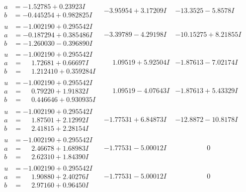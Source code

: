 \documentclass[1p]{elsarticle_modified}
\theoremstyle{definition}
\begin{document}
$$\begin{array}{c|c|c}
\begin{aligned}
a &= -1.52785 + 0.23923 I \\
b &= -0.445254 + 0.982825 I\end{aligned}
 & -3.95954 + 3.17209 I & -13.3525 - 5.8578 I \\ \hline\begin{aligned}
u &= -1.002190 + 0.295542 I \\
a &= -0.187294 + 0.385486 I \\
b &= -1.260030 - 0.396890 I\end{aligned}
 & -3.39789 - 4.29198 I & -10.15275 + 8.21855 I \\ \hline\begin{aligned}
u &= -1.002190 + 0.295542 I \\
a &= \phantom{-}1.72681 + 0.66697 I \\
b &= \phantom{-}1.212410 + 0.359284 I\end{aligned}
 & \phantom{-}1.09519 + 5.92504 I & -1.87613 - 7.02174 I \\ \hline\begin{aligned}
u &= -1.002190 + 0.295542 I \\
a &= \phantom{-}0.79220 + 1.91832 I \\
b &= \phantom{-}0.446646 + 0.930935 I\end{aligned}
 & \phantom{-}1.09519 - 4.07643 I & -1.87613 + 5.43329 I \\ \hline\begin{aligned}
u &= -1.002190 + 0.295542 I \\
a &= \phantom{-}1.87501 + 2.12992 I \\
b &= \phantom{-}2.41815 + 2.28154 I\end{aligned}
 & -1.77531 + 6.84873 I & -12.8872 - 10.8178 I \\ \hline\begin{aligned}
u &= -1.002190 + 0.295542 I \\
a &= \phantom{-}2.46678 + 1.68983 I \\
b &= \phantom{-}2.62310 + 1.84390 I\end{aligned}
 & -1.77531 - 5.00012 I & \phantom{-0.000000 } 0 \\ \hline\begin{aligned}
u &= -1.002190 + 0.295542 I \\
a &= \phantom{-}1.90880 + 2.40276 I \\
b &= \phantom{-}2.97160 + 0.96450 I\end{aligned}
 & -1.77531 - 5.00012 I & \phantom{-0.000000 } 0 \\ \hline\begin{aligned}

\end{aligned}
\end{array}$$
\end{document}
